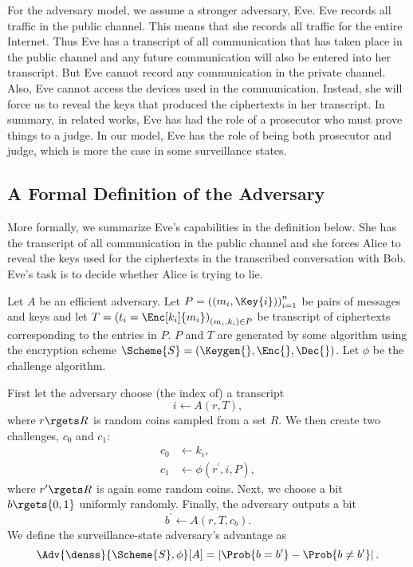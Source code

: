For the adversary model, we assume a stronger adversary, Eve.
Eve records all traffic in the public channel.
This means that she records all traffic for the entire Internet.
Thus Eve has a transcript of all communication that has taken place in the 
public channel and any future communication will also be entered into her 
transcript.
But Eve cannot record any communication in the private channel.
Also, Eve cannot access the devices used in the communication.
Instead, she will force us to reveal the keys that produced the ciphertexts in 
her transcript.
In summary, in related works, Eve has had the role of a prosecutor who must 
prove things to a judge.
In our model, Eve has the role of being both prosecutor and judge, which is 
more the case in some surveillance states.

\subsection{A Formal Definition of the Adversary}
\label{FormalAdversary}

More formally, we summarize Eve's capabilities in the definition below.
She has the transcript of all communication in the public channel and she 
forces Alice to reveal the keys used for the ciphertexts in the transcribed
conversation with Bob.
Eve's task is to decide whether Alice is trying to lie.

\begin{definition}\label{DEN-SS}
  Let \(A\) be an efficient adversary.
  Let \(P = \left( (m_i, \Key{i}) \right)_{i=1}^{n}\) be pairs of messages and 
  keys and let \(T = \left( t_i = \Enc[k_i]{ m_i } \right)_{(m_i, k_i)\in P}\) 
  be transcript of ciphertexts corresponding to the entries in \(P\).
  \(P\) and \(T\) are generated by some algorithm using the encryption scheme 
  \(\Scheme{S} = (\Keygen{}, \Enc{}, \Dec{})\).
  Let \(\phi\) be the challenge algorithm.

  First let the adversary choose (the index of) a transcript \[
    i\gets A( r, T ),
  \] where \(r\rgets R\) is random coins sampled from a set \(R\).
  We then create two challenges, \(c_0\) and \(c_1\):
  \begin{align*}
    c_0 &\gets k_i, \\
    c_1 &\gets \phi( r^\prime, i, P ),
  \end{align*}
  where \(r^\prime\rgets R\) is again some random coins.
  Next, we choose a bit \(b\rgets \{0, 1\}\) uniformly randomly.
  Finally, the adversary outputs a bit \[
    b^\prime\gets A( r, T, c_b ).
  \]
  We define the surveillance-state adversary's advantage as
  \begin{equation}\label{DEN-SSAdvantage}
    \Adv{\denss}{\Scheme{S}, \phi}[A] =
      \left|\Prob{b = b^\prime} - \Prob{b\neq b^\prime}\right|.
  \end{equation}
\end{definition}

